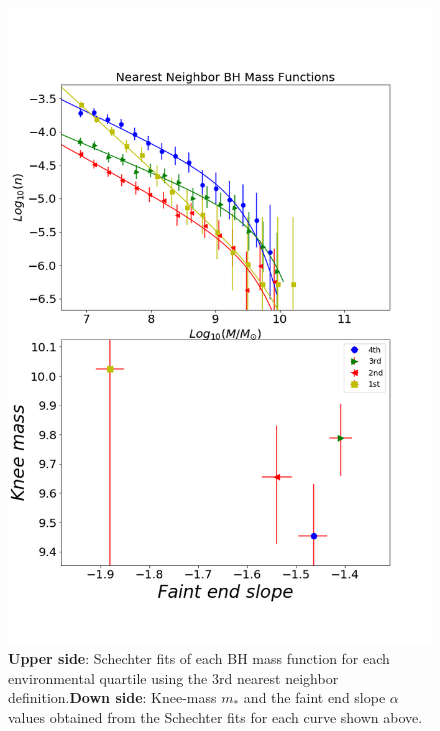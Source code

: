 \documentclass[a4paper,fleqn,usenatbib]{mnras}
\begin{document}
\begin{figure}
	\includegraphics[width=\columnwidth]{./pics/quartilesBH.png}
    \caption{\textbf{Upper side}: Schechter fits of each BH mass function for each environmental quartile using the 3rd nearest neighbor definition.\textbf{Down side}: Knee-mass $m_\ast$ and the faint end slope $\alpha$ values obtained from the Schechter fits for each curve shown above.}
    \label{fig:quartilesBH}
\end{figure}
\end{document}
